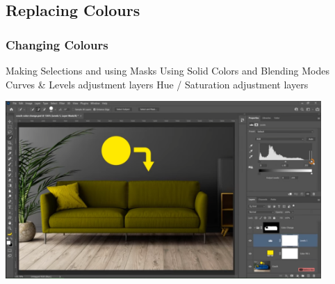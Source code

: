 \documentclass{beamer}
\begin{document}
			\subsection{Replacing Colours}		
				\begin{frame}
					\frametitle{Changing Colours}
					\begin{outline}
						\1 Making Selections and using Masks
						\1 Using Solid Colors and Blending Modes
						\1 Curves \& Levels adjustment layers
						\1 Hue / Saturation adjustment layers
					\end{outline}
				\includegraphics[width=0.9\textwidth]{images/color change.png}
				\end{frame}
\end{document}
